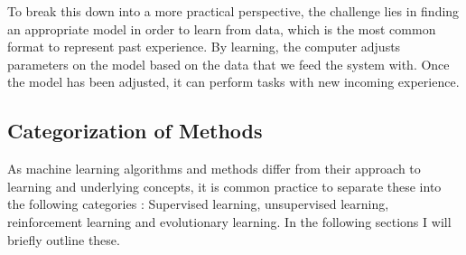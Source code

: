 To break this down into a more practical perspective, the challenge lies in finding an appropriate model in order to learn from data, which is the most common format to represent past experience. By learning, the computer adjusts parameters on the model based on the data that we feed the system with. Once the model has been adjusted, it can perform tasks with new incoming experience.

\subsection{Categorization of Methods}
As machine learning algorithms and methods differ from their approach to learning and underlying concepts, it is common practice to separate these into the following categories \cite{Duda:2000:PC:954544, Marsland:2009:MLA:1571643}  : Supervised learning, unsupervised learning, reinforcement learning and evolutionary learning. In the following sections I will briefly outline these.\\

